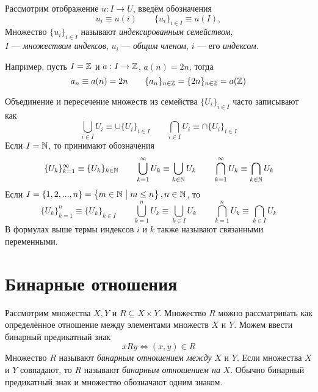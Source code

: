 Рассмотрим отображение $u:I\to U$, введём обозначения
\[
  u_{i}\equiv u(i)\qquad \{u_{i}\}_{i\in I}\equiv u(I),
\]
Множество $\{u_{i}\}_{i\in I}$ называют {\it индексированным семейством},\\
$I$ --- {\it множеством индексов}, $u_{i}$ --- {\it общим членом},
$i$ --- его {\it индексом}.

Например, пусть $I=\mathbb Z$ и $a:I\to \mathbb Z$, $a(n)=2n$, тогда
\[
  a_{n}\equiv a(n)=2n\qquad \{a_{n}\}_{n\in\mathbb Z}=\{2n\}_{n\in\mathbb Z}=a(\mathbb Z)
\]

Объединение и пересечение множеств из семейства $\{U_{i}\}_{i\in I}$
часто записывают как
\[
  \bigcup_{i\in I}U_{i}\equiv\cup \{U_{i}\}_{i\in I}\qquad
  \bigcap_{i\in I}U_{i}\equiv\cap \{U_{i}\}_{i\in I}
\]
Если $I=\mathbb N$, то принимают обозначения
\[
  \{U_{k}\}_{k=1}^{\infty}\equiv\{U_{k}\}_{k\in\mathbb N}\qquad
  \bigcup_{k=1}^{\infty}U_{k}\equiv\bigcup_{k\in\mathbb N}U_{k}\qquad
  \bigcap_{k=1}^{\infty}U_{k}\equiv\bigcap_{k\in\mathbb N}U_{k}
\]
Если $I=\{1,2,...,n\}=\left\{m\in\mathbb N\;\big|\;m\leq n\right\},n\in\mathbb N$, то
\[
  \{U_{k}\}_{k=1}^{n}\equiv\{U_{k}\}_{k\in I}\qquad
  \bigcup_{k=1}^{n}U_{k}\equiv\bigcup_{k\in I}U_{k}\qquad
  \bigcap_{k=1}^{n}U_{k}\equiv\bigcap_{k\in I}U_{k}
\]
В формулах выше термы индексов $i$ и $k$ также называют связанными переменными.


\section{Бинарные отношения}

Рассмотрим множества $X,Y$ и $R\subseteq X\times Y$. Множество $R$ можно рассматривать
как определённое отношение между элементами множеств $X$ и $Y$. Можем ввести бинарный
предикатный знак
\[
  xRy\iff (x,y)\in R
\]
Множество $R$ называют {\it бинарным отношением между}
$X$ и $Y$. Если множества $X$ и $Y$
совпадают, то $R$ называют {\it бинарным отношением на} $X$.
Обычно бинарный предикатный знак и множество обозначают одним знаком.

